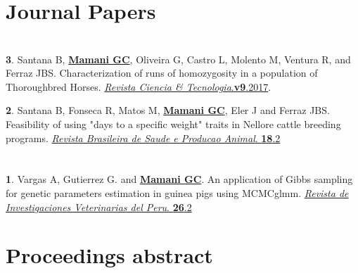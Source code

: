 \documentclass[margin,line,10pt]{res}
\newenvironment{list1}{
  \begin{list}{\ding{113}}{%
      \setlength{\itemsep}{0in}
      \setlength{\parsep}{0in} \setlength{\parskip}{0in}
      \setlength{\topsep}{0in} \setlength{\partopsep}{0in} 
      \setlength{\leftmargin}{0.17in}}}{\end{list}}
\begin{document}
\begin{resume}
\vspace{0.5cm}
\section{\sc Journal Papers}
\vspace{0.9cm}

\section{}
\begin{list1}
\item [{\bf 3}.]  Santana B, {\bf \underline{Mamani GC}}, Oliveira G, Castro L, Molento M, Ventura R, and Ferraz JBS. Characterization of runs of homozygosity in a population of Thoroughbred Horses.   
\textcolor{black}{\href{http://www.citec.fatecjab.edu.br/index.php/files/article/view/1161}{{\it Revista Ciencia & Tecnologia}.{\bf v9}.2017}. } 
\vspace{0.5cm}
\item [{\bf 2}.] Santana B, Fonseca R, Matos M, {\bf \underline{Mamani GC}}, Eler J and Ferraz JBS. Feasibility of using "days to a specific weight" traits in Nellore cattle breeding programs.   
\textcolor{black}{\href{http://www.scielo.br/scielo.php?script=sci_arttext&pid=S1519-99402017000200260}{{\it Revista Brasileira de Saude e Producao Animal}. {\bf 18}.2}}
\end{list1}
\vspace{0.5cm}

\section{}

\begin{list1}
\item [{\bf 1}.]  Vargas A, Gutierrez G. and {\bf \underline{Mamani GC}}.  
 An application of Gibbs sampling for genetic parameters estimation in guinea pigs using MCMCglmm.   
     \textcolor{black}{\href{http://dev.scielo.org.pe/scielo.php?script=sci_arttext&pid=S1609-91172015000200003&lng=en&nrm=iso}{{\it Revista de Investigaciones Veterinarias del Peru}. {\bf 26}.2 } } 
\end{list1}
\vspace{0.5cm}

\vspace{0.5cm}
\section{\sc Proceedings abstract}
\vspace{0.9cm}


\end{resume}
\end{document}
